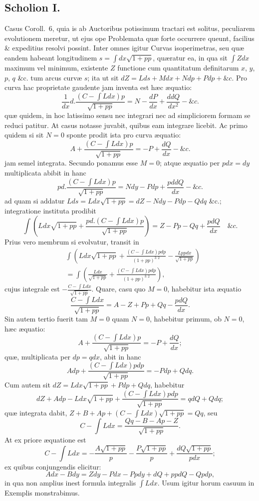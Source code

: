 \subsection*{Scholion I.}
Casus Coroll.~6, quia is ab Auctoribus potissimum tractari est solitus, peculiarem evolutionem meretur, ut ejus ope Problemata quæ forte occurrere queunt, facilius \& expeditius resolvi possint. Inter omnes igitur Curvas isoperimetras, seu quæ eandem habeant longitudinem $s=\int dx\sqrt{1+pp}$, quæratur ea, in qua sit $\int Zdx$ maximum vel minimum, existente $Z$ functione cum quantitatum definitarum $x$, $y$, $p$, $q$ \&c. tum arcus curvæ $s$; ita ut sit $dZ=Lds+Mdx+Ndp+Pdp+\&c.$ Pro curva hac proprietate gaudente jam inventa est hæc æquatio:
\[\frac1{dx}d.\frac{(C-\int Ldx)p}{\sqrt{1+pp}}=N-\frac{dP}{dx}+\frac{ddQ}{dx^2}-\&c.\]
quæ quidem, in hoc latissimo sensu nec integrari nec ad simpliciorem formam se reduci patitur. At casus notasse juvabit, quibus eam integrare licebit. Ac primo quidem si sit $N=0$ sponte prodit ista pro curva æquatio:
\[A+\frac{(C-\int Ldx)p}{\sqrt{1+pp}}=-P+\frac{dQ}{dx}-\&c.\]
jam semel integrata. Secundo ponamus esse $M=0$; atque æquatio per $pdx=dy$ multiplicata abibit in hanc
\[pd.\frac{(C-\int Ldx)p}{\sqrt{1+pp}}=Ndy-Pdp+\frac{pddQ}{dx}-\&c.\]
ad quam si addatur $Lds=Ldx\sqrt{1+pp}=dZ-Ndy-Pdp-Qdq$ \&c.; integratione instituta prodibit
\[\int\left(Ldx\sqrt{1+pp}+\frac{pd.(C-\int Ldx)p}{\sqrt{1+pp}}\right)=Z-Pp-Qq+\frac{pdQ}{dx}\quad\&c.\]
Prius vero membrum si evolvatur, transit in
\[
\begin{aligned}
&\int\left(Ldx\sqrt{1+pp}+\frac{(C-\int Ldx)pdp}{(1+pp)^{3:2}}-\frac{Lppdx}{\sqrt{1+pp}}\right)\\
&=\int\left(\frac{Ldx}{\sqrt{1+pp}}+\frac{(C-\int Ldx)pdp}{(1+pp)^{3:2}}\right),
\end{aligned}
\]
cujus integrale est $-\frac{C-\int Ldx}{\sqrt{1+pp}}$. Quare, casu quo $M=0$, habebitur ista æquatio
\[\frac{C-\int Ldx}{\sqrt{1+pp}}=A-Z+Pp+Qq-\frac{pdQ}{dx}.\]
Sin autem tertio fuerit tam $M=0$ quam $N=0$, habebitur primum, ob $N=0$, hæc æquatio:
\[A+\frac{(C-\int Ldx)p}{\sqrt{1+pp}}=-P+\frac{dQ}{dx};\]
quæ, multiplicata per $dp=qdx$, abit in hanc
\[Adp+\frac{(C-\int Ldx)pdp}{\sqrt{1+pp}}=-Pdp+Qdq.\]
Cum autem sit $dZ=Ldx\sqrt{1+pp}+Pdp+Qdq$, habebitur
\[dZ+Adp-Ldx\sqrt{1+pp}+\frac{(C-\int Ldx)pdp}{\sqrt{1+pp}}=qdQ+Qdq;\]
quæ integrata dabit, $Z+B+Ap+(C-\int Ldx)\sqrt{1+pp}=Qq$, seu
\[C-\int Ldx=\frac{Qq-B-Ap-Z}{\sqrt{1+pp}}.\]
At ex priore æquatione est
\[C-\int Ldx=-\frac{A\sqrt{1+pp}}p-\frac{P\sqrt{1+pp}}p+\frac{dQ\sqrt{1+pp}}{pdx};\]
ex quibus conjungendis elicitur:
\[Adx-Bdy=Zdy-Pdx-Ppdy+dQ+ppdQ-Qpdp,\]
in qua non amplius inest formula integralis $\int Ldx$. Usum igitur horum casuum in Exemplis monstrabimus.


